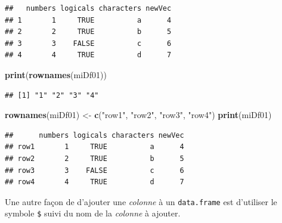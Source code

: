 \documentclass[
]{book}
\newenvironment{Shaded}{\begin{snugshade}}{\end{snugshade}}
\newcommand{\CommentTok}[1]{\textcolor[rgb]{0.56,0.35,0.01}{\textit{#1}}}
\newcommand{\DecValTok}[1]{\textcolor[rgb]{0.00,0.00,0.81}{#1}}
\newcommand{\KeywordTok}[1]{\textcolor[rgb]{0.13,0.29,0.53}{\textbf{#1}}}
\newcommand{\NormalTok}[1]{#1}
\newcommand{\OperatorTok}[1]{\textcolor[rgb]{0.81,0.36,0.00}{\textbf{#1}}}
\newcommand{\StringTok}[1]{\textcolor[rgb]{0.31,0.60,0.02}{#1}}
\begin{document}
\begin{verbatim}
##   numbers logicals characters newVec
## 1       1     TRUE          a      4
## 2       2     TRUE          b      5
## 3       3    FALSE          c      6
## 4       4     TRUE          d      7
\end{verbatim}

\begin{Shaded}
\begin{Highlighting}[]
\KeywordTok{print}\NormalTok{(}\KeywordTok{rownames}\NormalTok{(miDf01))}
\end{Highlighting}
\end{Shaded}

\begin{verbatim}
## [1] "1" "2" "3" "4"
\end{verbatim}

\begin{Shaded}
\begin{Highlighting}[]
\KeywordTok{rownames}\NormalTok{(miDf01) <-}\StringTok{ }\KeywordTok{c}\NormalTok{(}\StringTok{"row1"}\NormalTok{, }\StringTok{"row2"}\NormalTok{, }\StringTok{"row3"}\NormalTok{, }\StringTok{"row4"}\NormalTok{)}
\KeywordTok{print}\NormalTok{(miDf01)}
\end{Highlighting}
\end{Shaded}

\begin{verbatim}
##      numbers logicals characters newVec
## row1       1     TRUE          a      4
## row2       2     TRUE          b      5
## row3       3    FALSE          c      6
## row4       4     TRUE          d      7
\end{verbatim}

Une autre façon de d'ajouter une \emph{colonne} à un \texttt{data.frame} est d'utiliser le symbole \texttt{\$} suivi du nom de la \emph{colonne} à ajouter.

\begin{Shaded}
\end{Shaded}
\end{document}
